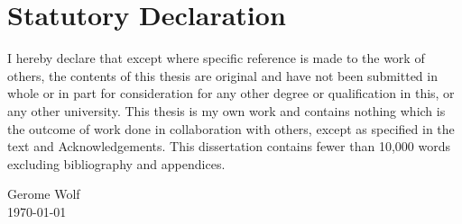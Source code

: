 \section*{Statutory Declaration}
I hereby declare that except where specific reference is made to the work of 
others, the contents of this thesis are original and have not been 
submitted in whole or in part for consideration for any other degree or 
qualification in this, or any other university. This thesis is my own 
work and contains nothing which is the outcome of work done in collaboration 
with others, except as specified in the text and Acknowledgements. This 
dissertation contains fewer than 10,000 words excluding bibliography and appendices.

\flushright
Gerome Wolf\\
\today
\vfill